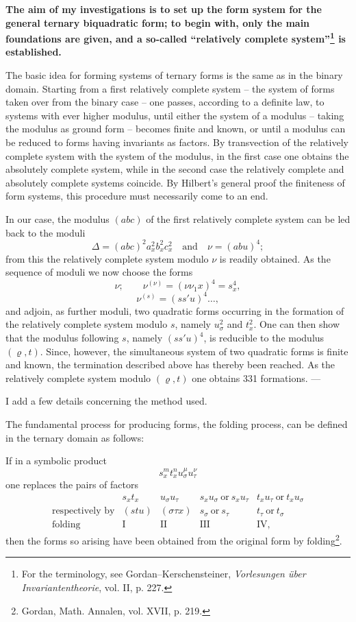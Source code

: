 \documentclass[11pt]{article}
\begin{document}
\textbf{The aim of my investigations is to set up the form system for the general ternary biquadratic form; to begin with, only the main foundations are given, and a so-called ``relatively complete system''\footnote{For the terminology, see Gordan--Kerschensteiner, \emph{Vorlesungen über Invariantentheorie}, vol. II, p. 227.} is established.}

The basic idea for forming systems of ternary forms is the same as in the binary domain. Starting from a first relatively complete system -- the system of forms taken over from the binary case -- one passes, according to a definite law, to systems with ever higher modulus, until either the system of a modulus -- taking the modulus as ground form -- becomes finite and known, or until a modulus can be reduced to forms having invariants as factors. By transvection of the relatively complete system with the system of the modulus, in the first case one obtains the absolutely complete system, while in the second case the relatively complete and absolutely complete systems coincide. By Hilbert's general proof the finiteness of form systems, this procedure must necessarily come to an end.

In our case, the modulus $(abc)$ of the first relatively complete system can be led back to the moduli
\[
\Delta=(abc)^2a_x^2b_x^2c_x^2\quad\text{and}\quad \nu=(abu)^4;
\]
from this the relatively complete system modulo $\nu$ is readily obtained. As the sequence of moduli we now choose the forms
\[
\nu;\qquad \nu^{(\nu)}=(\nu\nu_1x)^4=s_x^4,
\]
\[
\nu^{(s)}=(ss'u)^4\ldots,
\]
and adjoin, as further moduli, two quadratic forms occurring in the formation of the relatively complete system modulo $s$, namely $u_\sigma^2$ and $t_x^2$. One can then show that the modulus following $s$, namely $(ss'u)^4$, is reducible to the modulus $(\varrho,t)$. Since, however, the simultaneous system of two quadratic forms is finite and known, the termination described above has thereby been reached. As the relatively complete system modulo $(\varrho,t)$ one obtains 331 formations. ---

I add a few details concerning the method used.

The fundamental process for producing forms, the folding process, can be defined in the ternary domain as follows:

If in a symbolic product
\[
s_x^m t_x^n u_\sigma^\mu u_\tau^\nu
\]
one replaces the pairs of factors
\[
\begin{array}{c|c|c|c|c}
 & s_xt_x & u_\sigma u_\tau & s_xu_\sigma\ \text{or}\ s_xu_\tau & t_xu_\tau\ \text{or}\ t_xu_\sigma\\
\text{respectively by} & (stu) & (\sigma\tau x) & s_\sigma\ \text{or}\ s_\tau & t_\tau\ \text{or}\ t_\sigma\\
\text{folding} & \mathrm{I} & \mathrm{II} & \mathrm{III} & \mathrm{IV},
\end{array}
\]
then the forms so arising have been obtained from the original form by folding\footnote{Gordan, Math. Annalen, vol. XVII, p. 219.}.
\end{document}
